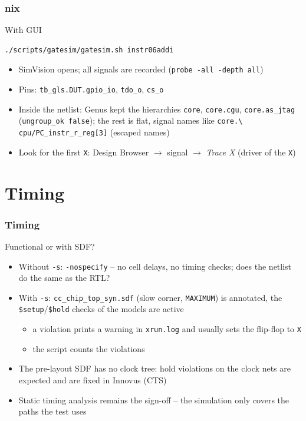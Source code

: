 \documentclass{beamer}
\newcommand{\astitle}{nix}
\newcommand{\assubtitle}{nix}
\newcommand{\cmd}[1]{\texttt{#1}}
\begin{document}
\renewcommand{\assubtitle}{With GUI}
\begin{frame}[fragile]
\frametitle{\astitle}
\begin{block}{\assubtitle}
\begin{lstlisting}[style=sh]
./scripts/gatesim/gatesim.sh instr06addi
\end{lstlisting}
  \begin{itemize}
    \item SimVision opens; all signals are recorded (\cmd{probe -all
      -depth all})
    \item Pins: \cmd{tb\_gls.DUT.gpio\_io}, \cmd{tdo\_o}, \cmd{cs\_o}
    \item Inside the netlist: Genus kept the hierarchies \cmd{core},
      \cmd{core.cgu}, \cmd{core.as\_jtag} (\cmd{ungroup\_ok false}); the
      rest is flat, signal names like \cmd{core.\textbackslash
      cpu/PC\_instr\_r\_reg[3]} (escaped names)
    \item Look for the first \cmd{X}: Design Browser $\rightarrow$
      signal $\rightarrow$ \emph{Trace X} (driver of the \cmd{X})
  \end{itemize}
\end{block}
\end{frame}

\section{Timing}
\renewcommand{\astitle}{Timing}

\renewcommand{\assubtitle}{Functional or with SDF?}
\begin{frame}
\frametitle{\astitle}
\begin{block}{\assubtitle}
  \begin{itemize}
    \item Without \cmd{-s}: \cmd{-nospecify} -- no cell delays, no timing
      checks; does the netlist do the same as the RTL?
    \item With \cmd{-s}: \cmd{cc\_chip\_top\_syn.sdf} (slow corner,
      \cmd{MAXIMUM}) is annotated, the \cmd{\$setup}/\cmd{\$hold} checks of
      the models are active
    \begin{itemize}
      \item a violation prints a warning in \cmd{xrun.log} and usually
        sets the flip-flop to \cmd{X}
      \item the script counts the violations
    \end{itemize}
    \item The pre-layout SDF has no clock tree: hold violations on the
      clock nets are expected and are fixed in Innovus (CTS)
    \item Static timing analysis remains the sign-off -- the simulation
      only covers the paths the test uses
  \end{itemize}
\end{block}
\end{frame}
\end{document}
